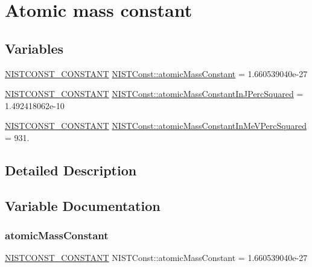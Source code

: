 \hypertarget{group___n_i_s_t_const-_atomic_mass_constant}{}\section{Atomic mass constant}
\label{group___n_i_s_t_const-_atomic_mass_constant}
\subsection*{Variables}
\begin{DoxyCompactItemize}
\item 
\mbox{\hyperlink{_n_i_s_t_const_8hpp_a2b0fc1d7452373f816175dd86ce26729}{N\+I\+S\+T\+C\+O\+N\+S\+T\+\_\+\+C\+O\+N\+S\+T\+A\+NT}} \mbox{\hyperlink{group___n_i_s_t_const-_atomic_mass_constant_ga0425d000ba96e26f28e4728444142010}{N\+I\+S\+T\+Const\+::atomic\+Mass\+Constant}} = 1.\+660539040e-\/27
\item 
\mbox{\hyperlink{_n_i_s_t_const_8hpp_a2b0fc1d7452373f816175dd86ce26729}{N\+I\+S\+T\+C\+O\+N\+S\+T\+\_\+\+C\+O\+N\+S\+T\+A\+NT}} \mbox{\hyperlink{group___n_i_s_t_const-_atomic_mass_constant_ga2e051baa0d89927080288e2289ac0346}{N\+I\+S\+T\+Const\+::atomic\+Mass\+Constant\+In\+J\+Perc\+Squared}} = 1.\+492418062e-\/10
\item 
\mbox{\hyperlink{_n_i_s_t_const_8hpp_a2b0fc1d7452373f816175dd86ce26729}{N\+I\+S\+T\+C\+O\+N\+S\+T\+\_\+\+C\+O\+N\+S\+T\+A\+NT}} \mbox{\hyperlink{group___n_i_s_t_const-_atomic_mass_constant_ga050dd5d7f3c4ee37a9ff7456ce82f8d2}{N\+I\+S\+T\+Const\+::atomic\+Mass\+Constant\+In\+Me\+V\+Perc\+Squared}} = 931.
\end{DoxyCompactItemize}


\subsection{Detailed Description}


\subsection{Variable Documentation}
\mbox{\label{group___n_i_s_t_const-_atomic_mass_constant_ga0425d000ba96e26f28e4728444142010}} 
\subsubsection{\texorpdfstring{atomic\+Mass\+Constant}{atomicMassConstant}}
{\footnotesize\ttfamily \mbox{\hyperlink{_n_i_s_t_const_8hpp_a2b0fc1d7452373f816175dd86ce26729}{N\+I\+S\+T\+C\+O\+N\+S\+T\+\_\+\+C\+O\+N\+S\+T\+A\+NT}} N\+I\+S\+T\+Const\+::atomic\+Mass\+Constant = 1.\+660539040e-\/27}

